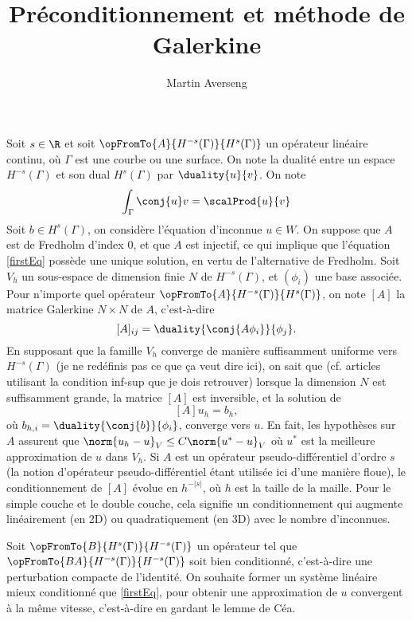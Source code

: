 \documentclass[]{article}
\title{Préconditionnement et méthode de Galerkine}
\author{Martin Averseng}
\begin{document}
	\maketitle
	Soit $s \in \R$ et soit $\opFromTo{A}{H^{-s}(\Gamma)}{H^{s}(\Gamma)}$ un opérateur linéaire continu, où $\Gamma$ est une courbe ou une surface. On note la dualité entre un espace $H^{-s}(\Gamma)$ et son dual $H^{s}(\Gamma)$ par $\duality{u}{v}$. On note
	\[\int_{\Gamma}\conj{u}v = \scalProd{u}{v}\]
	Soit $b \in H^s(\Gamma)$, on considère l'équation 
	d'inconnue $u \in W$. On suppose que $A$ est de Fredholm d'index $0$, et que $A$ est injectif, ce qui implique que l'équation \eqref{firstEq} possède une unique solution, en vertu de l'alternative de Fredholm. 
	Soit $V_h$ un sous-espace de dimension finie $N$ de $H^{-s}(\Gamma)$, et $(\phi_i)$ une base associée. Pour n'importe quel opérateur $\opFromTo{A}{H^{-s}(\Gamma)}{H^s(\Gamma)}$, on note $\left[A\right]$ la matrice Galerkine $N\times N$ de $A$, c'est-à-dire 
	\[[A]_{ij} = \duality{\conj{A\phi_i}}{\phi_j}.\]
	En supposant que la famille $V_h$ converge de manière suffisamment uniforme vers $H^{-s}(\Gamma)$ (je ne redéfinis pas ce que ça veut dire ici), on sait que (cf. articles utilisant la condition inf-sup que je dois retrouver) lorsque la dimension $N$ est suffisamment grande, la matrice $[A]$ est inversible, et la solution de 
	\[[A]u_h = b_h,\]
	où $b_{h,i} = \duality{\conj{b}}{\phi_i}$, converge vers $u$. En fait, les hypothèses sur $A$ assurent que $\norm{u_h - u}_{V} \leq C \norm{u^* - u}_V$ où $u^*$ est la meilleure approximation de $u$ dans $V_h$.  
	Si $A$ est un opérateur pseudo-différentiel d'ordre $s$ (la notion d'opérateur pseudo-différentiel étant utilisée ici d'une manière floue), le conditionnement de $[A]$ évolue en $h^{-|s|}$, où $h$ est la taille de la maille. Pour le simple couche et le double couche, cela signifie un conditionnement qui augmente linéairement (en 2D) ou quadratiquement (en 3D) avec le nombre d'inconnues. 
	
	Soit $\opFromTo{B}{H^s(\Gamma)}{H^{-s}(\Gamma)}$ un opérateur tel que $\opFromTo{BA}{H^{-s}(\Gamma)}{H^{-s}(\Gamma)}$ soit bien conditionné, c'est-à-dire une perturbation compacte de l'identité. 
	On souhaite former un système linéaire mieux conditionné que \eqref{firstEq}, pour obtenir une approximation de $u$ convergent à la même vitesse, c'est-à-dire en gardant le lemme de Céa. 
	
\end{document}
